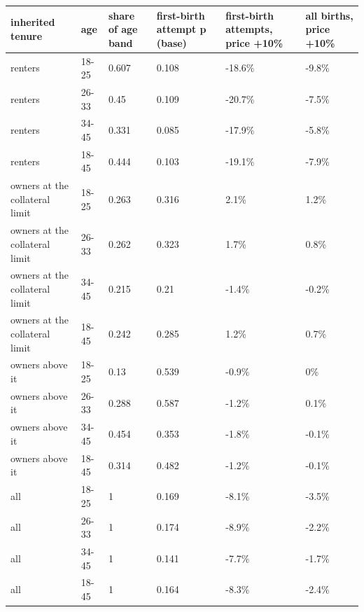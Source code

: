 \begingroup\small
\setlength{\tabcolsep}{3pt}
\renewcommand{\arraystretch}{1.04}
\begin{tabularx}{\linewidth}{XXXXXX}
\toprule
inherited tenure & age & share of age band & first-birth attempt p (base) & first-birth attempts, price +10\% & all births, price +10\% \\
\midrule
renters & 18-25 & 0.607 & 0.108 & -18.6\% & -9.8\% \\
renters & 26-33 & 0.45 & 0.109 & -20.7\% & -7.5\% \\
renters & 34-45 & 0.331 & 0.085 & -17.9\% & -5.8\% \\
renters & 18-45 & 0.444 & 0.103 & -19.1\% & -7.9\% \\
owners at the collateral limit & 18-25 & 0.263 & 0.316 & 2.1\% & 1.2\% \\
owners at the collateral limit & 26-33 & 0.262 & 0.323 & 1.7\% & 0.8\% \\
owners at the collateral limit & 34-45 & 0.215 & 0.21 & -1.4\% & -0.2\% \\
owners at the collateral limit & 18-45 & 0.242 & 0.285 & 1.2\% & 0.7\% \\
owners above it & 18-25 & 0.13 & 0.539 & -0.9\% & 0\% \\
owners above it & 26-33 & 0.288 & 0.587 & -1.2\% & 0.1\% \\
owners above it & 34-45 & 0.454 & 0.353 & -1.8\% & -0.1\% \\
owners above it & 18-45 & 0.314 & 0.482 & -1.2\% & -0.1\% \\
all & 18-25 & 1 & 0.169 & -8.1\% & -3.5\% \\
all & 26-33 & 1 & 0.174 & -8.9\% & -2.2\% \\
all & 34-45 & 1 & 0.141 & -7.7\% & -1.7\% \\
all & 18-45 & 1 & 0.164 & -8.3\% & -2.4\% \\
\bottomrule
\end{tabularx}
\endgroup
